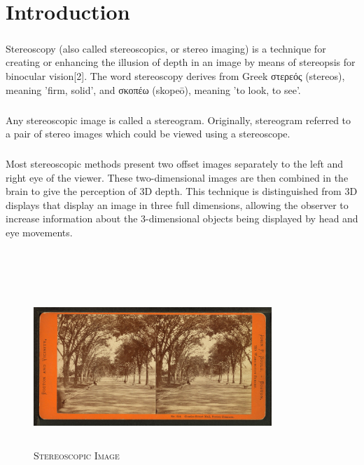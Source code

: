 \chapter{Introduction}

\large{\paragraph{}Stereoscopy (also called stereoscopics, or stereo imaging) is a technique for creating or enhancing the illusion of depth in an image by means of stereopsis for binocular vision[2]. The word stereoscopy derives from Greek στερεός (stereos), meaning 'firm, solid', and σκοπέω (skopeō), meaning 'to look, to see'.}
\large{\paragraph{}Any stereoscopic image is called a stereogram. Originally, stereogram referred to a pair of stereo images which could be viewed using a stereoscope.}
\large{\paragraph{}Most stereoscopic methods present two offset images separately to the left and right eye of the viewer. These two-dimensional images are then combined in the brain to give the perception of 3D depth. This technique is distinguished from 3D displays that display an image in three full dimensions, allowing the observer to increase information about the 3-dimensional objects being displayed by head and eye movements.}\\\\

\begin{figure}[H]
  \centering
    \includegraphics[height= 6cm, width=9cm]{project/images/stereo}
  \caption{\textsc{Stereoscopic Image}}
\end{figure}

